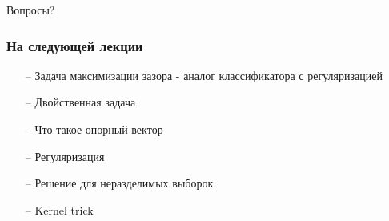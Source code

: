 \documentclass[10pt]{beamer}
\begin{document}
\begin{frame}[standout]
  Вопросы?
\end{frame}

\appendix

\begin{frame}\frametitle{На следующей лекции}
	\begin{itemize}
	  	\item[--] Задача максимизации зазора - аналог классификатора с регуляризацией
    \item[--] Двойственная задача 
    \item[--] Что такое опорный вектор
    \item[--] Регуляризация
    \item[--] Решение для неразделимых выборок
    \item[--] Kernel trick    
	\end{itemize}
\end{frame}
\end{document}
